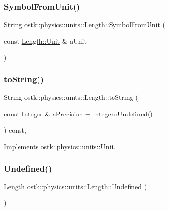 \subsubsection{\texorpdfstring{Symbol\+From\+Unit()}{SymbolFromUnit()}}
{\footnotesize\ttfamily String ostk\+::physics\+::units\+::\+Length\+::\+Symbol\+From\+Unit (\begin{DoxyParamCaption}\item[{const \hyperlink{classostk_1_1physics_1_1units_1_1_length_a2664470a7eedf5d45c88861fe69badea}{Length\+::\+Unit} \&}]{a\+Unit }\end{DoxyParamCaption})\hspace{0.3cm}{\ttfamily [static]}}

\mbox{\label{classostk_1_1physics_1_1units_1_1_length_ad3ec518939d2ffc86cd73b8ed4c071af}} 
\subsubsection{\texorpdfstring{to\+String()}{toString()}}
{\footnotesize\ttfamily String ostk\+::physics\+::units\+::\+Length\+::to\+String (\begin{DoxyParamCaption}\item[{const Integer \&}]{a\+Precision = {\ttfamily Integer\+:\+:Undefined()} }\end{DoxyParamCaption}) const\hspace{0.3cm}{\ttfamily [override]}, {\ttfamily [virtual]}}



Implements \hyperlink{classostk_1_1physics_1_1units_1_1_unit_a8162b4eb8221c7577af16ab8b399d07e}{ostk\+::physics\+::units\+::\+Unit}.

\mbox{\label{classostk_1_1physics_1_1units_1_1_length_a1e76f961e57ed36274cf75e860b68726}} 
\subsubsection{\texorpdfstring{Undefined()}{Undefined()}}
{\footnotesize\ttfamily \hyperlink{classostk_1_1physics_1_1units_1_1_length}{Length} ostk\+::physics\+::units\+::\+Length\+::\+Undefined (\begin{DoxyParamCaption}{ }\end{DoxyParamCaption})\hspace{0.3cm}{\ttfamily [static]}}

